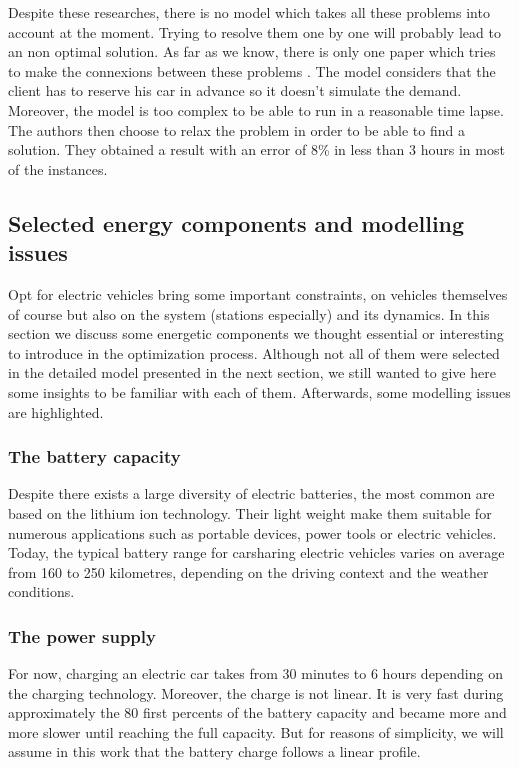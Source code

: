 \begin{bibunit}[ieeetr]
\medskip
Despite these researches, there is no model which takes all these problems into account at the moment.
Trying to resolve them one by one will probably lead to an non optimal solution.
As far as we know, there is only one paper which tries to make the connexions between these problems \cite{boyaci_optimization_2015}.
The model considers that the client has to reserve his car in advance so it doesn't simulate the demand.
Moreover, the model is too complex to be able to run in a reasonable time lapse.
The authors then choose to relax the problem in order to be able to find a solution.
They obtained a result with an error of 8\% in less than 3 hours in most of the instances.

\subsection{Selected energy components and modelling issues}
Opt for electric vehicles bring some important constraints, on vehicles themselves of course but also on the system (stations especially) and its dynamics.
In this section we discuss some energetic components we thought essential or interesting to introduce in the optimization process.
Although not all of them were selected in the detailed model presented in the next section, we still wanted to give here some insights to be familiar with each of them.
Afterwards, some modelling issues are highlighted.

\subsubsection{The battery capacity}
Despite there exists a large diversity of electric batteries, the most common are based on the lithium ion technology.
Their light weight make them suitable for numerous applications such as portable devices, power tools or electric vehicles.
Today, the typical battery range for carsharing electric vehicles varies on average from 160 to 250 kilometres, depending on the driving context and the weather conditions.

\subsubsection{The power supply}
For now, charging an electric car takes from 30 minutes to 6 hours depending on the charging technology.
Moreover, the charge is not linear.
It is very fast during approximately the 80 first percents of the battery capacity and became more and more slower until reaching the full capacity.
But for reasons of simplicity, we will assume in this work that the battery charge follows a linear profile.


\end{bibunit}
